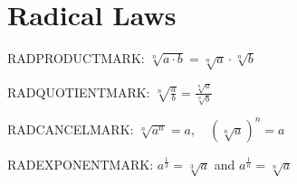 \documentclass{didactic}
\begin{document}
\section{Radical Laws}

RADPRODUCTMARK: $\sqrt[n]{a \cdot b} = \sqrt[n]{a} \cdot \sqrt[n]{b}$

RADQUOTIENTMARK: $\displaystyle \sqrt[n]{\frac{a}{b}} = \frac{\sqrt[n]{a}}{\sqrt[n]{b}}$

RADCANCELMARK: $\sqrt[n]{a^n} = a, \quad \left(\sqrt[n]{a}\right)^n = a$

RADEXPONENTMARK: $a^{\frac{1}{3}} = \sqrt[3]{a}$ and $a^{\frac{1}{n}} = \sqrt[n]{a}$
\end{document}
